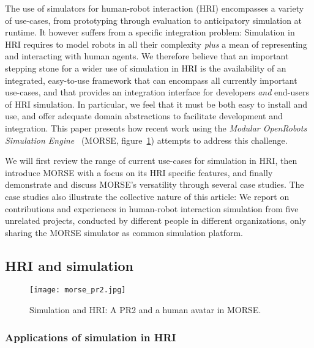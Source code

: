 \documentclass{llncs}
\begin{document}
The use of simulators for human-robot interaction (HRI) encompasses a variety of
use-cases, from prototyping through evaluation to anticipatory simulation at
runtime. It however suffers from a specific integration problem: Simulation in
HRI requires to model robots in all their complexity \emph{plus} a mean of
representing and interacting with human agents. We therefore believe that an
important stepping stone for a wider use of simulation in HRI is the
availability of an integrated, easy-to-use framework that can encompass all
currently important use-cases, and that provides an integration interface for
developers \emph{and} end-users of HRI simulation.  In particular, we feel that
it must be both easy to install and use, and offer adequate domain abstractions
to facilitate development and integration. This paper presents how recent work
using the \emph{Modular OpenRobots Simulation Engine}~\cite{morse_simpar_2012}
(MORSE, figure~\ref{fig|morse-hri}) attempts to address this challenge. 

We will first review the range of current use-cases for simulation in HRI, then
introduce MORSE with a focus on its HRI specific features, and finally
demonstrate and discuss MORSE's versatility through several case studies. The
case studies also illustrate the collective nature of this article: We report on
contributions and experiences in human-robot interaction simulation from five
unrelated projects, conducted by different people in different organizations,
only sharing the MORSE simulator as common simulation platform. 


\subsection*{HRI and simulation}

\begin{figure}[t]
      \centering 
      \texttt{[image: morse\_pr2.jpg]}
      \caption{Simulation and HRI: A PR2 and a human avatar in MORSE.}
      \label{fig|morse-hri}
\end{figure}

\subsubsection*{Applications of simulation in HRI}
\end{document}
